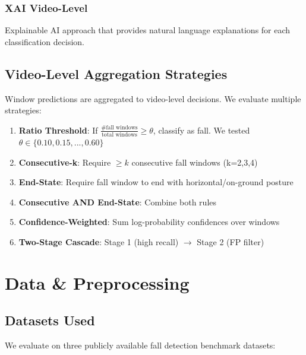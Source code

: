 \documentclass[conference]{IEEEtran}
\begin{document}
\subsubsection{XAI Video-Level}
Explainable AI approach that provides natural language explanations for each classification decision.

\subsection{Video-Level Aggregation Strategies}

Window predictions are aggregated to video-level decisions. We evaluate multiple strategies:

\begin{enumerate}[leftmargin=*]
    \item \textbf{Ratio Threshold}: If $\frac{\text{\# fall windows}}{\text{total windows}} \geq \theta$, classify as fall. We tested $\theta \in \{0.10, 0.15, ..., 0.60\}$
    \item \textbf{Consecutive-k}: Require $\geq k$ consecutive fall windows (k=2,3,4)
    \item \textbf{End-State}: Require fall window to end with horizontal/on-ground posture
    \item \textbf{Consecutive AND End-State}: Combine both rules
    \item \textbf{Confidence-Weighted}: Sum log-probability confidences over windows
    \item \textbf{Two-Stage Cascade}: Stage 1 (high recall) $\rightarrow$ Stage 2 (FP filter)
\end{enumerate}

\section{Data \& Preprocessing}

\subsection{Datasets Used}

We evaluate on three publicly available fall detection benchmark datasets:
\end{document}
